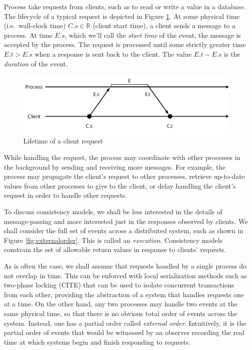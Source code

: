 \documentclass[]             %
{NASA}                       %
\theoremstyle{definition}
\begin{document}
Process take requests from clients, such as to read or write a value in
a database. The lifecycle of a typical request is depicted in Figure
\ref{fig:request}. At some physical time (i.e.~wall-clock time)
\(C.s \in \mathbb{R}\) (client start time), a client sends a message to
a process. At time \(E.s\), which we'll call the \emph{start time} of
the event, the message is accepted by the process. The request is
processed until some strictly greater time \(E.t > E.s\) when a response
is sent back to the client. The value \(E.t - E.s\) is the
\emph{duration} of the event.

\begin{figure}
  \center
  \includegraphics[scale=0.4]{images/request.png}
  \caption{Lifetime of a client request}
  \label{fig:request}
\end{figure}

While handling the request, the process may coordinate with other
processes in the background by sending and receiving more messages. For
example, the process may propagate the client's request to other
processes, retrieve up-to-date values from other processes to give to
the client, or delay handling the client's request in order to handle
other requests.

To discuss consistency models, we shall be less interested in the
details of message-passing and more interested just in the responses
observed by clients. We shall consider the full set of events across a
distributed system, such as shown in Figure \ref{fig:externalorder}.
This is called an \emph{execution}. Consistency models constrain the set
of allowable return values in response to clients' requests.

As is often the case, we shall assume that requests handled by a single
process do not overlap in time. This can be enforced with local
serialization methods such as two-phase locking (CITE) that can be used
to isolate concurrent transactions from each other, providing the
abstraction of a system that handles requests one at a time. On the
other hand, any two processes may handle two events at the same physical
time, so that there is no obvious total order of events across the
system. Instead, one has a partial order called \emph{external order}.
Intuitively, it is the partial order of events that would be witnessed
by an observer recording the real time at which systems begin and finish
responding to requests.
\end{document}
